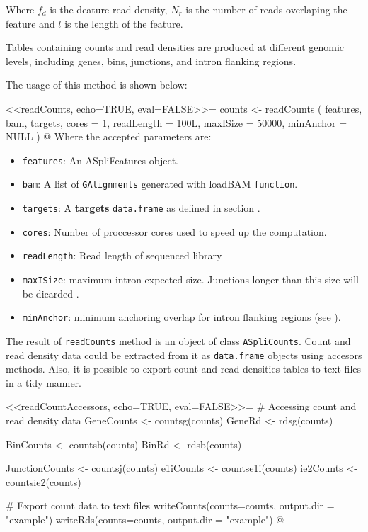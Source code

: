 \documentclass{article}
\begin{document}
Where $f_{d}$ is the deature read density, $N_{r}$ is the number of reads
overlaping the feature and $l$ is the length of the feature.

Tables containing counts and read densities are produced at different
genomic levels, including genes, bins, junctions, and intron flanking regions.

The usage of this method is shown below:

<<readCounts, echo=TRUE, eval=FALSE>>=
counts <- readCounts ( 
    features, 
    bam, 
    targets, 
    cores = 1, 
    readLength = 100L, 
    maxISize = 50000,
    minAnchor = NULL )
@
Where the accepted parameters are:

\begin{itemize}
  \item \texttt{features}: An ASpliFeatures object. 
  \item \texttt{bam}: A list of \texttt{GAlignments} generated with loadBAM
\texttt{function}.
  \item \texttt{targets}: A \textbf{targets} \texttt{data.frame} as defined in
section . 
  \item \texttt{cores}: Number of proccessor cores used to speed up the
computation.
  \item \texttt{readLength}: Read length of sequenced library 
  \item \texttt{maxISize}: maximum intron expected size. Junctions longer than
this size will be dicarded \cite{Hong01122006}.
  \item \texttt{minAnchor}: minimum anchoring overlap for intron flanking
  regions (see  ). 
\end{itemize}

The result of \texttt{readCounts} method is an object of class 
\texttt{ASpliCounts}. Count and read density data could be extracted from it as
\texttt{data.frame} objects using accesors methods. Also, it is possible to 
export count and read densities tables to text files in a tidy manner.

<<readCountAccessors, echo=TRUE, eval=FALSE>>=
# Accessing count and read density data
GeneCounts <- countsg(counts)
GeneRd <- rdsg(counts)

BinCounts <- countsb(counts)
BinRd <- rdsb(counts)

JunctionCounts <- countsj(counts)
e1iCounts <- countse1i(counts)
ie2Counts <- countsie2(counts)

# Export count data to text files 
writeCounts(counts=counts, output.dir = "example")
writeRds(counts=counts, output.dir = "example")
@
\end{document}

